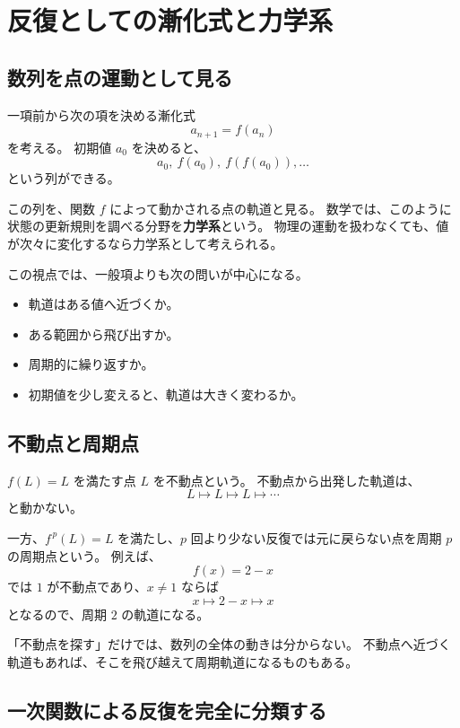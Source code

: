 
\section{反復としての漸化式と力学系}

\subsection{数列を点の運動として見る}

一項前から次の項を決める漸化式
\[
  a_{n+1}=f(a_n)
\]
を考える。
初期値 $a_0$ を決めると、
\[
  a_0,\ f(a_0),\ f(f(a_0)),\ldots
\]
という列ができる。

この列を、関数 $f$ によって動かされる点の軌道と見る。
数学では、このように状態の更新規則を調べる分野を\textbf{力学系}という。
物理の運動を扱わなくても、値が次々に変化するなら力学系として考えられる。

この視点では、一般項よりも次の問いが中心になる。

\begin{itemize}
  \item 軌道はある値へ近づくか。
  \item ある範囲から飛び出すか。
  \item 周期的に繰り返すか。
  \item 初期値を少し変えると、軌道は大きく変わるか。
\end{itemize}

\subsection{不動点と周期点}

$f(L)=L$ を満たす点 $L$ を不動点という。
不動点から出発した軌道は、
\[
  L\longmapsto L\longmapsto L\longmapsto\cdots
\]
と動かない。

一方、$f^{\,p}(L)=L$ を満たし、$p$ 回より少ない反復では元に戻らない点を周期 $p$ の周期点という。
例えば、
\[
  f(x)=2-x
\]
では $1$ が不動点であり、$x\neq1$ ならば
\[
  x\longmapsto 2-x\longmapsto x
\]
となるので、周期 $2$ の軌道になる。

「不動点を探す」だけでは、数列の全体の動きは分からない。
不動点へ近づく軌道もあれば、そこを飛び越えて周期軌道になるものもある。

\subsection{一次関数による反復を完全に分類する}

